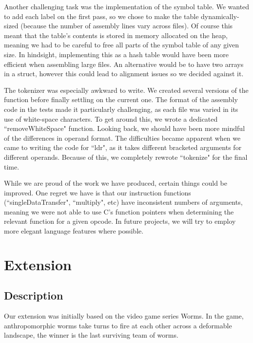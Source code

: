 \documentclass[]{article}
\begin{document}
\vspace{3mm}

Another challenging task was the implementation of the symbol table. We wanted to add each label on the first pass, so we chose to make the table dynamically-sized (because the number of assembly lines vary across files). Of course this meant that the table's contents is stored in memory allocated on the heap, meaning we had to be careful to free all parts of the symbol table of any given size. In hindsight, implementing this as a hash table would have been more efficient when assembling large files. An alternative would be to have two arrays in a struct, however this could lead to alignment issues so we decided against it.

\newpage

The tokenizer was especially awkward to write. We created several versions of the function before finally settling on the current one. The format of the assembly code in the tests made it particularly challenging, as each file was varied in its use of white-space characters. To get around this, we wrote a dedicated ``removeWhiteSpace" function. Looking back, we should have been more mindful of the differences in operand format. The difficulties became apparent when we came to writing the code for ``ldr", as it takes different bracketed arguments for different operands. Because of this, we completely rewrote ``tokenize" for the final time.

\vspace{5mm}

While we are proud of the work we have produced, certain things could be improved. One regret we have is that our instruction functions (``singleDataTransfer", ``multiply", etc) have inconsistent numbers of arguments, meaning we were not able to use C's function pointers when determining the relevant function for a given opcode. In future projects, we will try to employ more elegant language features where possible.

\vspace{4mm}

\section*{Extension}

\vspace{4mm}

\subsection*{Description}
Our extension was initially based on the video game series Worms. In the game, anthropomorphic worms take turns to fire at each other across a deformable landscape, the winner is the last surviving team of worms.
\end{document}
